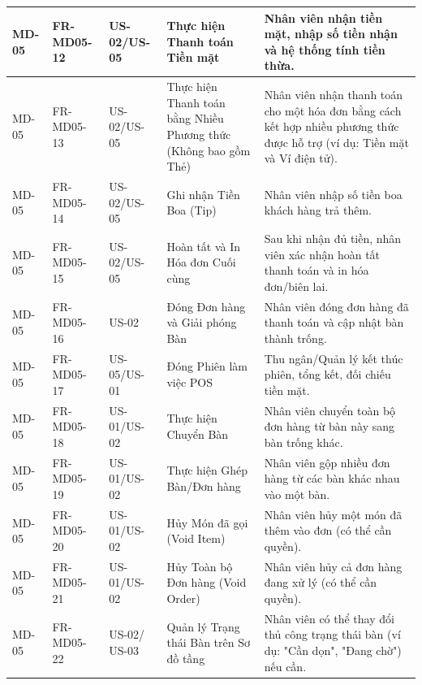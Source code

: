 \begin{longtable}{|m{2cm}|m{2.5cm}|m{2cm}|m{4.5cm}|m{4cm}|}
\hline
MD-05 & FR-MD05-12 & US-02/US-05 & Thực hiện Thanh toán Tiền mặt & Nhân viên nhận tiền mặt, nhập số tiền nhận và hệ thống tính tiền thừa. \\
\hline
MD-05 & FR-MD05-13 & US-02/US-05 & Thực hiện Thanh toán bằng Nhiều Phương thức (Không bao gồm Thẻ) & Nhân viên nhận thanh toán cho một hóa đơn bằng cách kết hợp nhiều phương thức được hỗ trợ (ví dụ: Tiền mặt và Ví điện tử). \\
\hline
MD-05 & FR-MD05-14 & US-02/US-05 & Ghi nhận Tiền Boa (Tip) & Nhân viên nhập số tiền boa khách hàng trả thêm. \\
\hline
MD-05 & FR-MD05-15 & US-02/US-05 & Hoàn tất và In Hóa đơn Cuối cùng & Sau khi nhận đủ tiền, nhân viên xác nhận hoàn tất thanh toán và in hóa đơn/biên lai. \\
\hline
MD-05 & FR-MD05-16 & US-02 & Đóng Đơn hàng và Giải phóng Bàn & Nhân viên đóng đơn hàng đã thanh toán và cập nhật bàn thành trống. \\
\hline
MD-05 & FR-MD05-17 & US-05/US-01 & Đóng Phiên làm việc POS & Thu ngân/Quản lý kết thúc phiên, tổng kết, đối chiếu tiền mặt. \\
\hline
MD-05 & FR-MD05-18 & US-01/US-02 & Thực hiện Chuyển Bàn & Nhân viên chuyển toàn bộ đơn hàng từ bàn này sang bàn trống khác. \\
\hline
MD-05 & FR-MD05-19 & US-01/US-02 & Thực hiện Ghép Bàn/Đơn hàng & Nhân viên gộp nhiều đơn hàng từ các bàn khác nhau vào một bàn. \\
\hline
MD-05 & FR-MD05-20 & US-01/US-02 & Hủy Món đã gọi (Void Item) & Nhân viên hủy một món đã thêm vào đơn (có thể cần quyền). \\
\hline
MD-05 & FR-MD05-21 & US-01/US-02 & Hủy Toàn bộ Đơn hàng (Void Order) & Nhân viên hủy cả đơn hàng đang xử lý (có thể cần quyền). \\
\hline
MD-05 & FR-MD05-22 & US-02/ US-03 & Quản lý Trạng thái Bàn trên Sơ đồ tầng & Nhân viên có thể thay đổi thủ công trạng thái bàn (ví dụ: "Cần dọn", "Đang chờ") nếu cần. \\
\hline

\end{longtable}


